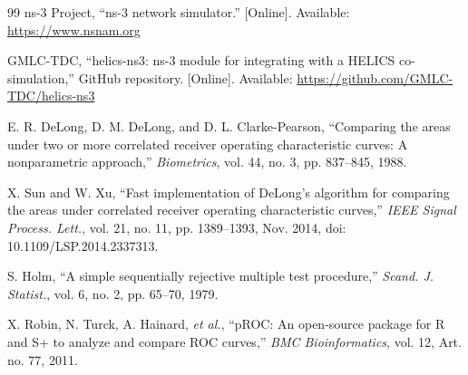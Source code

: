 \documentclass[journal]{IEEEtran}
\theoremstyle{plain}
\theoremstyle{definition}
\theoremstyle{remark}
\begin{document}
\begin{thebibliography}{99}
 ns-3 Project, ``ns-3 network simulator.'' [Online]. Available: \url{https://www.nsnam.org}

 GMLC-TDC, ``helics-ns3: ns-3 module for integrating with a HELICS co-simulation,'' GitHub repository. [Online]. Available: \url{https://github.com/GMLC-TDC/helics-ns3}

 E. R. DeLong, D. M. DeLong, and D. L. Clarke-Pearson, ``Comparing the areas under two or more correlated receiver operating characteristic curves: A nonparametric approach,'' \emph{Biometrics}, vol. 44, no. 3, pp. 837--845, 1988.

 X. Sun and W. Xu, ``Fast implementation of DeLong's algorithm for comparing the areas under correlated receiver operating characteristic curves,'' \emph{IEEE Signal Process. Lett.}, vol. 21, no. 11, pp. 1389--1393, Nov. 2014, doi: 10.1109/LSP.2014.2337313.

 S. Holm, ``A simple sequentially rejective multiple test procedure,'' \emph{Scand. J. Statist.}, vol. 6, no. 2, pp. 65--70, 1979.

 X. Robin, N. Turck, A. Hainard, \emph{et al.}, ``pROC: An open-source package for R and S+ to analyze and compare ROC curves,'' \emph{BMC Bioinformatics}, vol. 12, Art. no. 77, 2011.

\end{thebibliography}

\end{document}
